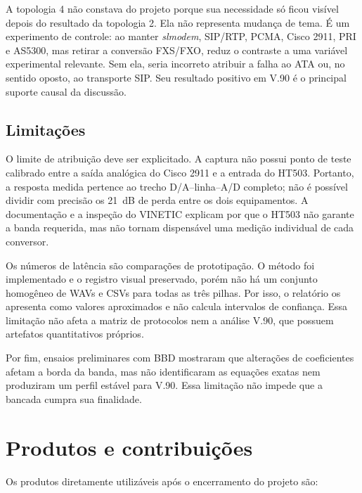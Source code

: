 \documentclass[12pt,a4paper]{article}
\newcommand{\slmodem}{\textit{slmodem}}
\begin{document}
A topologia 4 não constava do projeto porque sua necessidade só ficou visível depois
do resultado da topologia 2. Ela não representa mudança de tema. É um experimento
de controle: ao manter \slmodem, SIP/RTP, PCMA, Cisco 2911, PRI e AS5300, mas retirar
a conversão FXS/FXO, reduz o contraste a uma variável experimental relevante. Sem
ela, seria incorreto atribuir a falha ao ATA ou, no sentido oposto, ao transporte
SIP. Seu resultado positivo em V.90 é o principal suporte causal da discussão.

\subsection{Limitações}

O limite de atribuição deve ser explicitado. A captura não possui ponto de teste
calibrado entre a saída analógica do Cisco 2911 e a entrada do HT503. Portanto, a
resposta medida pertence ao trecho D/A--linha--A/D completo; não é possível dividir
com precisão os \SI{21}{dB} de perda entre os dois equipamentos. A documentação e
a inspeção do VINETIC explicam por que o HT503 não garante a banda requerida, mas
não tornam dispensável uma medição individual de cada conversor.

Os números de latência são comparações de prototipação. O método foi implementado e
o registro visual preservado, porém não há um conjunto homogêneo de WAVs e CSVs para
todas as três pilhas. Por isso, o relatório os apresenta como valores aproximados e
não calcula intervalos de confiança. Essa limitação não afeta a matriz de protocolos
nem a análise V.90, que possuem artefatos quantitativos próprios.

Por fim, ensaios preliminares com BBD mostraram que alterações de coeficientes afetam
a borda da banda, mas não identificaram as equações exatas nem produziram um perfil
estável para V.90. Essa limitação não impede que a bancada cumpra sua finalidade.

\section{Produtos e contribuições}

Os produtos diretamente utilizáveis após o encerramento do projeto são:
\end{document}
